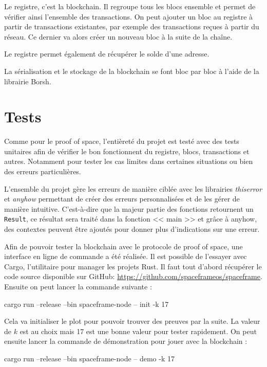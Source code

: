 Le registre, c'est la blockchain. Il regroupe tous les blocs ensemble et permet de vérifier ainsi l'ensemble des transactions. On peut ajouter un bloc au registre à partir de transactions existantes, par exemple des transactions reçues à partir du réseau. Ce dernier va alors créer un nouveau bloc à la suite de la chaîne.

Le registre permet également de récupérer le solde d'une adresse.

La sérialisation et le stockage de la blockchain se font bloc par bloc à l'aide de la librairie Borsh.

\section{Tests}

Comme pour le proof of space, l'entièreté du projet est testé avec des tests unitaires afin de vérifier le bon fonctionnent du registre, blocs, transactions et autres. Notamment pour tester les cas limites dans certaines situations ou bien des erreurs particulières.

L'ensemble du projet gère les erreurs de manière ciblée avec les librairies \emph{thiserror} et \emph{anyhow} permettant de créer des erreurs personnalisées et de les gérer de manière intuitive. C'est-à-dire que la majeur partie des fonctions retournent un \verb|Result|, ce résultat sera traité dans la fonction << main >> et grâce à anyhow, des contextes peuvent être ajoutés pour donner plus d'indications sur une erreur.

Afin de pouvoir tester la blockchain avec le protocole de proof of space, une interface en ligne de commande a été réalisée. Il est possible de l'essayer avec Cargo, l'utilitaire pour manager les projets Rust. Il faut tout d'abord récupérer le code source disponible sur GitHub: \url{https://github.com/spaceframeos/spaceframe}. Ensuite on peut lancer la commande suivante :

\begin{shellcmd}
  cargo run --release --bin spaceframe-node -- init -k 17
\end{shellcmd}

Cela va initialiser le plot pour pouvoir trouver des preuves par la suite. La valeur de $k$ est au choix mais 17 est une bonne valeur pour tester rapidement. On peut ensuite lancer la commande de démonstration pour jouer avec la blockchain :

\begin{shellcmd}
  cargo run --release --bin spaceframe-node -- demo -k 17
\end{shellcmd}


